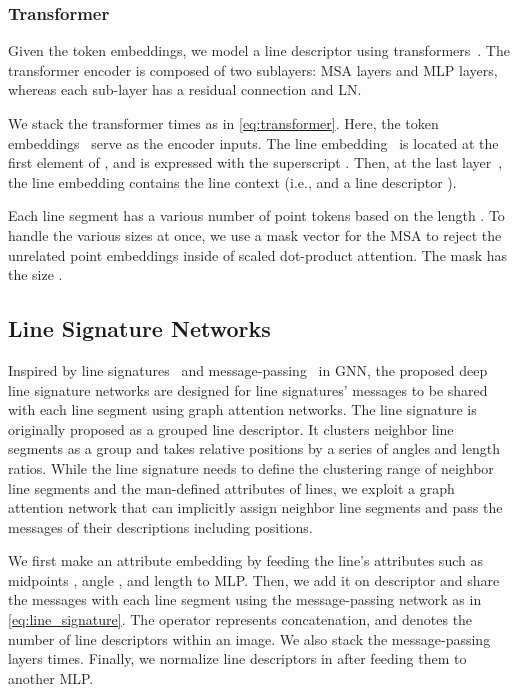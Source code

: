 \documentclass[letterpaper, 10 pt, journal, twoside]{ieeetran}
\begin{document}
\subsubsection{Transformer}

Given the token embeddings, we model a line descriptor using transformers~\cite{Vaswani2017}. The transformer encoder is composed of two sublayers: \ac{MSA} layers and \ac{MLP} layers, whereas each sub-layer has a residual connection and \ac{LN}.

We stack the transformer  times as in \eqref{eq:transformer}. Here, the token embeddings~ serve as the encoder inputs. The line embedding~ is located at the first element of , and is expressed with the superscript . Then, at the last layer~, the line embedding contains the line context (i.e.,  and a line descriptor ).



Each line segment has a various number of point tokens based on the length . To handle the various sizes at once, we use a mask vector  for the \ac{MSA} to reject the unrelated point embeddings inside of scaled dot-product attention. The mask has the size .

\subsection{Line Signature Networks}

Inspired by line signatures~\cite{Wang2009} and message-passing~\cite{Sarlin2019, Velickovic2018} in \ac{GNN}, the proposed deep line signature networks are designed for line signatures' messages to be shared with each line segment using graph attention networks. The line signature is originally proposed as a grouped line descriptor. It clusters neighbor line segments as a group and takes relative positions by a series of angles and length ratios. While the line signature needs to define the clustering range of neighbor line segments and the man-defined attributes of lines, we exploit a graph attention network that can implicitly assign neighbor line segments and pass the messages of their descriptions including positions.





We first make an attribute embedding by feeding the line's attributes such as midpoints , angle , and length  to \ac{MLP}. Then, we add it on descriptor  and share the messages with each line segment using the message-passing network as in \eqref{eq:line_signature}. The operator  represents concatenation, and  denotes the number of line descriptors within an image. We also stack the message-passing layers  times. Finally, we normalize line descriptors in  after feeding them to another \ac{MLP}.
\end{document}
